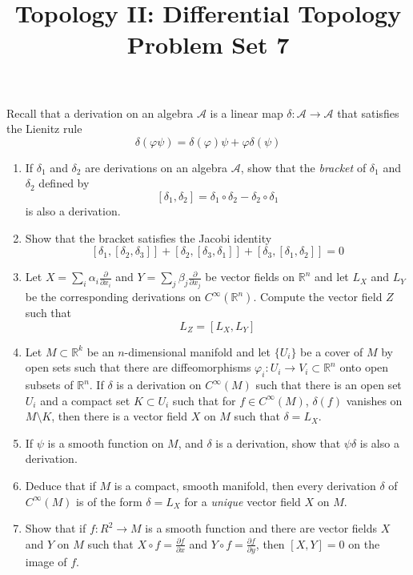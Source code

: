 \documentclass[12pt]{article}
\newcommand{\R}{\mathbb{R}}
\newcommand{\del}{\partial}
\newcommand{\A}{\mathcal{A}}
\begin{document}
\title{Topology II: Differential Topology\\
Problem Set 7} 
\date{}
\maketitle

\thispagestyle{empty}

Recall that a derivation on an algebra $\A$ is a linear map $\delta:\A\to \A$ that satisfies the Lienitz rule 
$$\delta(\varphi\psi)=\delta(\varphi)\psi+\varphi\delta(\psi)$$

\begin{enumerate}

\item If $\delta_1$ and $\delta_2$ are derivations on an algebra $\A$, show that the \emph{bracket} of $\delta_1$ and $\delta_2$ defined by
$$[\delta_1, \delta_2]=\delta_1\circ\delta_2-\delta_2\circ \delta_1$$
is also a derivation.

\item Show that the bracket satisfies the Jacobi identity
$$[\delta_1,[\delta_2,\delta_3]]+ [\delta_2,[\delta_3,\delta_1]]+[\delta_3,[\delta_1,\delta_2]]=0$$

\item Let $X=\sum_i \alpha_i\frac{\del}{\del x_i}$ and $Y=\sum_j \beta_j\frac{\del}{\del x_j}$ be vector fields on $\R^n$ and let $L_X$ and $L_Y$ be the corresponding derivations on $C^\infty(\R^n)$. Compute the vector field $Z$ such that 
$$L_Z=[L_X,L_Y]$$

\item Let $M\subset \R^k$ be an $n$-dimensional manifold and let $\{U_i\}$ be a cover of $M$ by open sets such that there are diffeomorphisms $\varphi_i:U_i\to V_i\subset \R^n$ onto open subsets of $\R^n$. If $\delta$ is a derivation on $C^\infty(M)$ such that there is an open set $U_i$ and a compact set $K\subset U_i$ such that for $f\in C^\infty(M)$, $\delta(f)$ vanishes on $M\setminus K$, then there is a vector field $X$ on $M$ such that $\delta=L_X$.

\item If $\psi$ is a smooth function on $M$, and $\delta$ is a derivation, show that $\psi\delta$ is also a derivation.

\item Deduce that if $M$ is a compact, smooth manifold, then every derivation $\delta$ of $C^\infty(M)$ is of the form $\delta=L_X$ for a \emph{unique} vector field $X$ on $M$. 

\item Show that if $f:R^2\to M$ is a smooth function and there are vector fields $X$ and $Y$ on $M$ such that $X\circ f=\frac{\del f}{\del x}$ and $Y\circ f=\frac{\del f}{\del y}$, then $[X,Y]=0$ on the image of $f$.


\end{enumerate}
\end{document}
